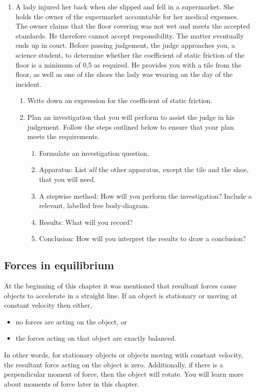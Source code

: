 \begin{enumerate}
\item {A lady injured her back when she slipped and fell in a supermarket. She holds the owner of the supermarket accountable for her medical expenses. The owner claims that the floor covering was not wet and meets the accepted standards. He therefore cannot accept responsibility. The matter eventually ends up in court. Before passing judgement, the judge approaches you, a science student, to determine whether the coefficient of static friction of the floor is a minimum of 0,5 as required. He provides you with a tile from the floor, as well as one of the shoes the lady was wearing on the day of the incident. 
\begin{enumerate} 
\item{Write down an expression for the coefficient of static friction.} 
\item{Plan an investigation that you will perform to assist the judge in his judgement. Follow the steps outlined below to ensure that your plan meets the requirements. 
	\begin{enumerate} 
	\item{Formulate an investigation question.} 
	\item{Apparatus: List \emph{all} the other apparatus, except the tile and the shoe, that you will need.} 
	\item{A stepwise method: How will you perform the investigation? Include a relevant, labelled free body-diagram.}
 	\item{Results: What will you record?} 
	\item{Conclusion: How will you interpret the results to draw a conclusion?} 
	\end{enumerate}}
\end{enumerate}
}
\end{enumerate}

\subsection{Forces in equilibrium}
At the beginning of this chapter it was mentioned that resultant forces cause objects to accelerate in a straight line. If an object is stationary or moving at constant velocity then either,
\begin{itemize}
\item{no forces are acting on the object, or}
\item{the forces acting on that object are exactly balanced.}
\end{itemize}
In other words, for stationary objects or objects moving with constant velocity, the resultant force acting on the object is zero. Additionally, if there is a perpendicular moment of force, then the object will rotate. You will learn more about moments of force later in this chapter.

